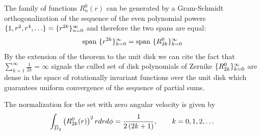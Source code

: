 \documentclass[preprint,12pt]{elsarticle}
\begin{document}
%
The family of functions $R_{n}^{0}(r)$ can be generated by a Gram-Schmidt orthogonalization of the sequence of the even polynomial powers $\lst{1,r^{2},r^{4},\dots} = \lst{r^{2k}}_{n=0}^{\infty}$ and therefore the two spans are equal:
  \begin{equation}
    \text{span } \lbrace r^{2k} \rbrace_{k=0}^{\infty} = \text{span } \lbrace R_{2k}^{0} \rbrace_{k=0}^{\infty}
  \end{equation}
By the extension of the \mst theorem to the unit disk \cite{ms} we can cite the fact that $\sum_{k=1}^{\infty}\frac{1}{2k} = \infty$ signals the culled set of disk polynomials of Zernike $\lbrace R_{2k}^{0} \rbrace_{k=0}^{\infty}$ are dense in the space of rotationally invariant functions over the unit disk which guarantees uniform convergence of the sequence of partial sums.

The normalization for the set with zero angular velocity is given by
  \begin{equation}
      \int_{\overline{D}_{2}} \left( R_{2k}^{0}(r) \right)^{2} r dr d\phi = \frac{1} { 2\left( 2k + 1 \right) }, \qquad k = 0, 1, 2, \dots
  \end{equation}

\end{document}
